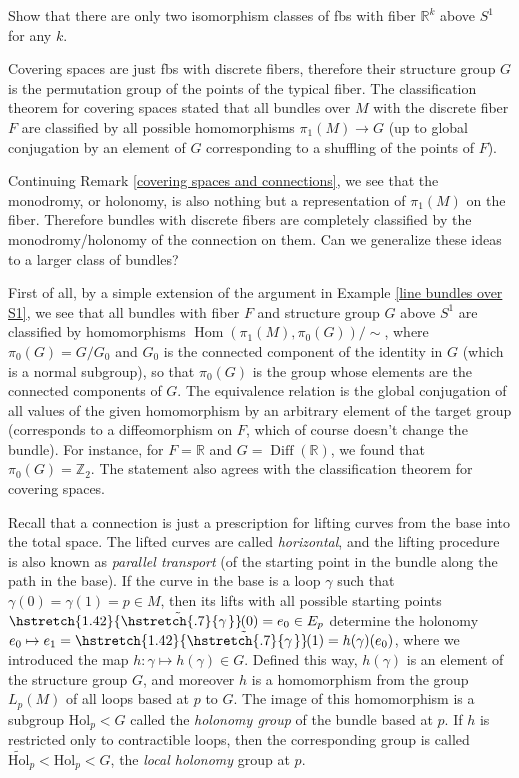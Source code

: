 \documentclass[english,letterpaper]{article}%
\numberwithin{equation}{section}
\numberwithin{figure}{section}
\numberwithin{table}{section}
\theoremstyle{definition}
\theoremstyle{definition}
\theoremstyle{definition}
\theoremstyle{plain}
\theoremstyle{plain}
\theoremstyle{plain}
\theoremstyle{plain}
\theoremstyle{remark}
\theoremstyle{remark}
\DeclareMathOperator{\Hom}{Hom}
\DeclareMathOperator{\Diff}{Diff}
\newcommand\wt[1]{\hstretch{1.42}{\tilde{\hstretch{.7}{#1\mkern2mu}}}\mkern-2mu}
\begin{document}
\begin{xca}\label{Rk-bundles above circle}
    Show that there are only two isomorphism classes of \glspl{fb} with fiber $\mathbb{R}^k$  above $S^1$ for any $k$.
\end{xca}


\begin{example}
	Covering spaces are just \glspl{fb} with discrete fibers, therefore their structure group $G$ is the permutation group of the points of the typical fiber. The classification theorem for covering spaces stated that all bundles over $M$ with the discrete fiber $F$ are classified by all possible homomorphisms $\pi_1(M)\to G$ (up to global conjugation by an element of $G$ corresponding to a shuffling of the points of $F$).
	
	Continuing Remark \ref{covering spaces and connections}, we see that the monodromy, or holonomy, is also nothing but a representation of $\pi_1(M)$ on the fiber. Therefore bundles with discrete fibers are completely classified by the monodromy/holonomy of the connection on them. Can we generalize these ideas to a larger class of bundles?
	
	First of all, by a simple extension of the argument in Example \ref{line bundles over S1}, we see  that all bundles with fiber $F$ and structure group $G$ above $S^1$ are classified by homomorphisms $\Hom(\pi_1(M),\pi_0(G))/\sim$, where $\pi_0(G)=G/G_0$ and $G_0$ is the connected component of the identity in $G$ (which is a normal subgroup), so that $\pi_0(G)$ is the group whose elements are the connected components of $G$. The equivalence relation is the global conjugation of all values of the given homomorphism by an arbitrary element of the target group (corresponds to a diffeomorphism on $F$, which of course doesn't change the bundle). For instance, for $F=\mathbb{R}$ and $G=\Diff(\mathbb{R})$, we found that $\pi_0(G)=\mathbb{Z}_2$. The statement also agrees with the classification theorem for covering spaces.
	
	Recall that a connection is just a prescription for lifting curves from the base into the total space. The lifted curves are called \emph{horizontal}, and the lifting procedure is also known as \emph{parallel transport} (of the starting point in the bundle along the path in the base). If the curve in the base is a loop $\gamma$ such that $\gamma(0)=\gamma(1)=p\in M$, then its lifts with all possible starting points $\wt{\gamma}(0)=e_0\in E_p$ determine the holonomy $e_0\mapsto e_1=\wt{\gamma}(1)=h(\gamma)(e_0)$, where we introduced the map $h:\gamma\mapsto h(\gamma)\in G$. Defined this way, $h(\gamma)$ is an element of the structure group $G$, and moreover $h$ is a homomorphism from the group $L_p(M)$ of all loops based at $p$ to $G$. The image of this homomorphism is a subgroup $\mathrm{Hol}_p<G$ called the \emph{holonomy group} of the bundle based at $p$. If $h$ is restricted only to contractible loops, then the corresponding group is called $\widetilde{\mathrm{Hol}}_p<\mathrm{Hol}_p<G$, the \emph{local holonomy} group at $p$. 
	

\end{example}
\end{document}
